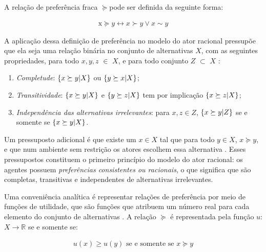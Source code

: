 A relação de preferência fraca \( \succeq \)pode ser definida da seguinte forma:

\begin{align*}
  \text{x} \succeq y \leftrightarrow x \succ y \lor x \sim y
\end{align*}

A aplicação dessa definição de preferência no modelo do ator racional pressupõe
que ela seja uma relação binária no conjunto de alternativas \(X\), com as
seguintes propriedades, para todo \(x,y,z\) $\in$ \(X\), e para todo conjunto
\(Z\) $\subset$ \(X\) \cite{gintis2016individuality,
  binmore2008rational}:



\begin{enumerate}
\item \textit{Completude}: \(\{ x \succeq y | \vspace{0.4cm} X \}\) ou \(\{ y \succeq x |
  \vspace{0.4cm} X \}\);
\item \textit{Transitividade}: \( \{x \succeq y | \vspace{0.4cm} X\} \) e \(\{y \succeq z |
  \vspace{0.4cm} X \}\) tem por implicação \(\{x \succeq z | \vspace{0.4cm} X\}\);
\item \textit{Independência das alternativas irrelevantes}: para \(x,z \in Z\),
  \(\{x \succeq y | \vspace{0.4cm} Z \}\) se e somente se \(\{x \succeq y | \vspace{0.4cm}
  X\}\).
\end{enumerate}

Um pressuposto adicional é que existe um \(x \in X\) tal que para todo \(y \in X\),
\(x \succeq y\), e que num ambiente sem restrição os atores escolhem essa alternativa
\cite{gintis2009bounds}. Esses pressupostos constituem o primeiro princípio do
modelo do ator racional: os agentes possuem \textit{preferências consistentes ou
racionais}, o que significa que são completas, transitivas e independentes de
alternativas irrelevantes.

Uma conveniência analítica é representar relações de preferência por meio de
funções de utilidade, que são funções que atribuem um número real para cada
elemento do conjunto de alternativas \cite{sep-preferences}. A relação \( \succeq\) é
representada pela função \(u\): \(X \longrightarrow \mathbb{R}\) se e somente se:

\begin{align*}
  u(x) \geq u(y)
  \text{ se e somente se }
  x \succeq y
\end{align*}

